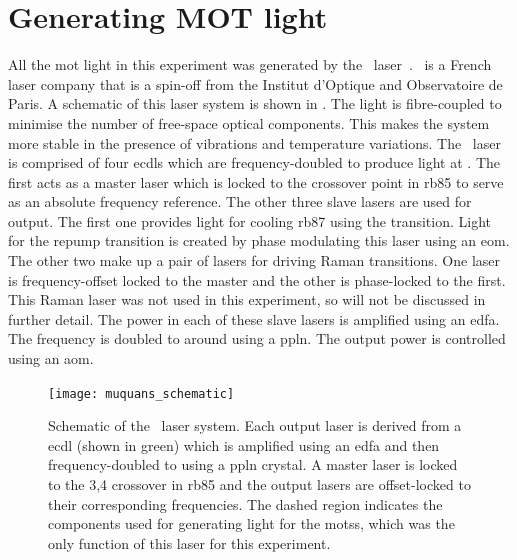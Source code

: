 \section{Generating MOT light}\label{sec:muquans_light}
 All the \ac{mot} light in this experiment was generated by the \Muquans\
laser~\cite{muquansWebPage}. \Muquans\ is a French laser company that is a
spin-off from the Institut d'Optique and Observatoire de Paris. A schematic of
this laser system is shown in \FigureRef{fig:muquans_schematic}. The
light is fibre-coupled to minimise the number of free-space optical components.
This makes the system more stable in the presence of vibrations and
temperature variations. The \Muquans\ laser is comprised of four
\sivalue{1560}{\nano\metre} \acp{ecdl} which are frequency-doubled to produce
light at \sivalue{780}{\nano\metre}. The first acts as a master laser
which is locked to the \trans{3}{3,4} crossover point in
\ac{rb85} to serve as an absolute frequency reference. The other three slave
lasers are used for output. The first one provides light for cooling \ac{rb87} using the  transition.
Light for the \trans{1}{2} repump transition is created by phase modulating this laser using an \ac{eom}.
The other two make up a pair of lasers for driving Raman transitions. One laser
is frequency-offset locked to the master and the other is phase-locked to the
first. This Raman laser was not used in this experiment, so will
not be discussed in further detail. The power in each of these slave lasers is amplified using
an \ac{edfa}. The frequency is doubled to around \sivalue{780}{\nano\metre} using a \ac{ppln}. The output power is controlled using an
\ac{aom}.
\begin{figure}[!htbp]
	\texttt{[image: muquans\_schematic]}
	\caption[\Muquans\ Laser System Diagram]{Schematic of the \Muquans\ laser system. Each output laser is derived from a \acs{ecdl} (shown in green) which is amplified using an \acs{edfa} and then frequency-doubled to  using a \acs{ppln} crystal. A master laser is locked to the 3,4 crossover in \ac{rb85} and the output lasers are offset-locked to their corresponding frequencies. The dashed region indicates the components used for generating light for the \acp{mots}, which was the only function of this laser for this experiment.}\label{fig:muquans_schematic}
\end{figure}
